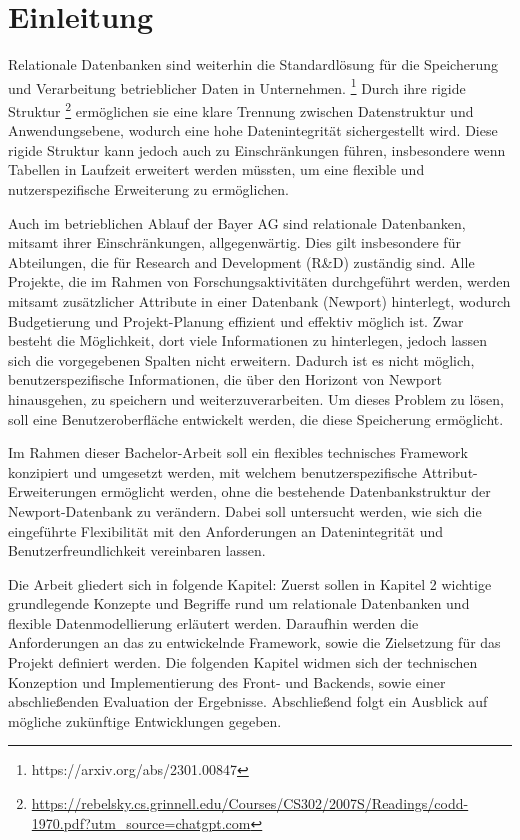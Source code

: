 \section{Einleitung}
Relationale Datenbanken sind weiterhin die Standardlösung für die Speicherung und Verarbeitung betrieblicher Daten in Unternehmen. \footnote{https://arxiv.org/abs/2301.00847}
Durch ihre rigide Struktur \footnote{\url{https://rebelsky.cs.grinnell.edu/Courses/CS302/2007S/Readings/codd-1970.pdf?utm_source=chatgpt.com}} ermöglichen sie eine klare Trennung zwischen Datenstruktur und Anwendungsebene, 
wodurch eine hohe Datenintegrität sichergestellt wird. Diese rigide Struktur kann jedoch auch zu Einschränkungen führen, insbesondere wenn Tabellen in Laufzeit erweitert werden müssten, um 
eine flexible und nutzerspezifische Erweiterung zu ermöglichen. 

Auch im betrieblichen Ablauf der Bayer AG sind relationale Datenbanken, mitsamt ihrer Einschränkungen, allgegenwärtig. 
Dies gilt insbesondere für Abteilungen, die für Research and Development (R\&D) zuständig sind. Alle Projekte,
die im Rahmen von Forschungsaktivitäten durchgeführt werden, werden mitsamt zusätzlicher Attribute in einer Datenbank (Newport) 
hinterlegt, wodurch Budgetierung und Projekt-Planung effizient und effektiv möglich ist. Zwar besteht die Möglichkeit,
dort viele Informationen zu hinterlegen, jedoch lassen sich die vorgegebenen Spalten nicht erweitern. Dadurch ist es 
nicht möglich, benutzerspezifische Informationen, die über den Horizont von Newport hinausgehen, zu speichern und weiterzuverarbeiten.
Um dieses Problem zu lösen, soll eine Benutzeroberfläche entwickelt werden, die diese Speicherung ermöglicht. 

Im Rahmen dieser Bachelor-Arbeit soll ein flexibles technisches Framework konzipiert und umgesetzt werden, mit welchem 
benutzerspezifische Attribut-Erweiterungen ermöglicht werden, ohne die bestehende Datenbankstruktur der Newport-Datenbank zu verändern.
Dabei soll untersucht werden, wie sich die eingeführte Flexibilität mit den Anforderungen an Datenintegrität und Benutzerfreundlichkeit vereinbaren lassen.

Die Arbeit gliedert sich in folgende Kapitel: Zuerst sollen in Kapitel 2 wichtige grundlegende Konzepte und Begriffe rund um relationale Datenbanken 
und flexible Datenmodellierung erläutert werden. Daraufhin werden die Anforderungen an das zu entwickelnde Framework, sowie die Zielsetzung für das Projekt 
definiert werden. Die folgenden Kapitel widmen sich der technischen Konzeption und Implementierung des Front- und Backends, sowie einer abschließenden Evaluation 
der Ergebnisse. Abschließend folgt ein Ausblick auf mögliche zukünftige Entwicklungen gegeben.


